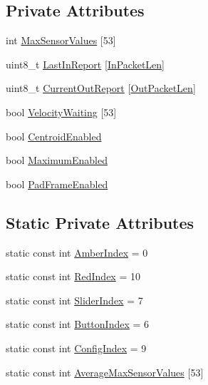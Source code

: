 \subsection*{\-Private \-Attributes}
\begin{DoxyCompactItemize}
\item 
int \hyperlink{classManta_aaec4ef50d24285ace0deda24d941185d}{\-Max\-Sensor\-Values} \mbox{[}53\mbox{]}
\item 
uint8\-\_\-t \hyperlink{classManta_a85dabdaeb8266210f46aa7b0e6a9b484}{\-Last\-In\-Report} \mbox{[}\hyperlink{classMantaUSB_a13d2528c9c12d91dd34a8f99b3fed0b3}{\-In\-Packet\-Len}\mbox{]}
\item 
uint8\-\_\-t \hyperlink{classManta_aeaac3f532708dd87197c963a5a9ee5d4}{\-Current\-Out\-Report} \mbox{[}\hyperlink{classMantaUSB_a32fd2c8f871a3639bf913f599c2f3b04}{\-Out\-Packet\-Len}\mbox{]}
\item 
bool \hyperlink{classManta_a88d174f57a8df8b83d6f9d1facc68d77}{\-Velocity\-Waiting} \mbox{[}53\mbox{]}
\item 
bool \hyperlink{classManta_a0db6605ab921fe05ce67a0dfef004591}{\-Centroid\-Enabled}
\item 
bool \hyperlink{classManta_ae0f462eb61007d202aaf12035a07117d}{\-Maximum\-Enabled}
\item 
bool \hyperlink{classManta_a1830d160b3a333fdc922757b6632bf09}{\-Pad\-Frame\-Enabled}
\end{DoxyCompactItemize}
\subsection*{\-Static \-Private \-Attributes}
\begin{DoxyCompactItemize}
\item 
static const int \hyperlink{classManta_a569d3ec1846c16d58fa157dee5944d5a}{\-Amber\-Index} = 0
\item 
static const int \hyperlink{classManta_a266da06045425ae8a1b1a53ed3d97d34}{\-Red\-Index} = 10
\item 
static const int \hyperlink{classManta_a710903745e9671b0da9281abb9b9dbf7}{\-Slider\-Index} = 7
\item 
static const int \hyperlink{classManta_a8316d17328d2d50f1e87940d8228c18e}{\-Button\-Index} = 6
\item 
static const int \hyperlink{classManta_ae651e21fe2506164f9f0a011e740b889}{\-Config\-Index} = 9
\item 
static const int \hyperlink{classManta_aea784dc40ed322b1eefba43e9d714eac}{\-Average\-Max\-Sensor\-Values} \mbox{[}53\mbox{]}
\end{DoxyCompactItemize}



